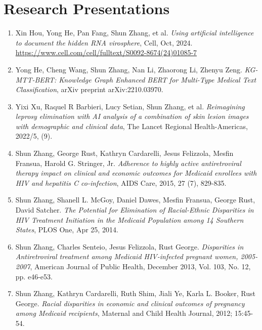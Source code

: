 \documentclass[letterpaper,11pt]{article}
\begin{document}
\section{Research Presentations} 
\begin{itemize}[leftmargin=0.15in, label={}]
    \normalsize{\item{
\begin{enumerate}
    \item Xin Hou, Yong He, Pan Fang, Shun Zhang, et al. \textit{Using artificial intelligence to document the hidden RNA virosphere}, Cell, Oct, 2024. \url{https://www.cell.com/cell/fulltext/S0092-8674(24)01085-7}
    \item Yong He, Cheng Wang, Shun Zhang, Nan Li, Zhaorong Li, Zhenyu Zeng. \textit{KG-MTT-BERT: Knowledge Graph Enhanced BERT for Multi-Type Medical Text Classification}, arXiv preprint arXiv:2210.03970.
    \item Yixi Xu, Raquel R Barbieri, Lucy Setian, Shun Zhang, et al. \textit{Reimagining leprosy elimination with AI analysis of a combination of skin lesion images with demographic and clinical data}, The Lancet Regional Health-Americas, 2022/5, (9).
    \item Shun Zhang, George Rust, Kathryn Cardarelli, Jesus Felizzola, Mesfin Fransua, Harold G. Stringer, Jr. \textit{Adherence to highly active antiretroviral therapy impact on clinical and economic outcomes for Medicaid enrollees with HIV and hepatitis C co-infection}, AIDS Care, 2015, 27 (7), 829-835.
    \item Shun Zhang, Shanell L. McGoy, Daniel Dawes, Mesfin Fransua, George Rust, David Satcher. \textit{The Potential for Elimination of Racial-Ethnic Disparities in HIV Treatment Initiation in the Medicaid Population among 14 Southern States}, PLOS One, Apr 25, 2014.
    \item Shun Zhang, Charles Senteio, Jesus Felizzola, Rust George. \textit{Disparities in Antiretroviral treatment among Medicaid HIV-infected pregnant women, 2005-2007}, American Journal of Public Health, December 2013, Vol. 103, No. 12, pp. e46-e53.
    \item Shun Zhang, Kathryn Cardarelli, Ruth Shim, Jiali Ye, Karla L. Booker, Rust George. \textit{Racial disparities in economic and clinical outcomes of pregnancy among Medicaid recipients}, Maternal and Child Health Journal, 2012; 15:45-54.

\end{enumerate}}}
\end{itemize}
\end{document}
